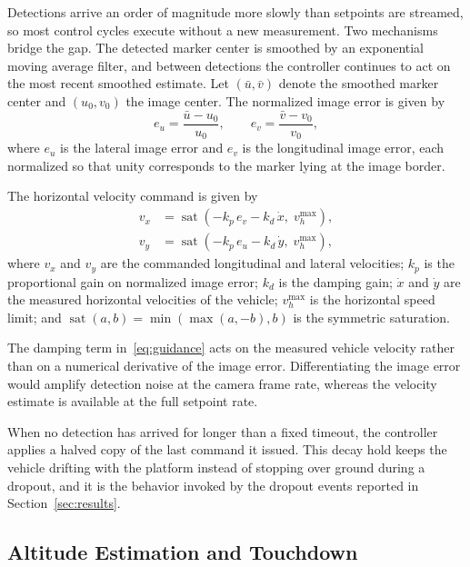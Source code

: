Detections arrive an order of magnitude more slowly than setpoints are streamed, so most
control cycles execute without a new measurement. Two mechanisms bridge the gap. The
detected marker center is smoothed by an exponential moving average filter, and between
detections the controller continues to act on the most recent smoothed estimate. Let
$(\bar{u},\bar{v})$ denote the smoothed marker center and $(u_0,v_0)$ the image center.
The normalized image error is given by
\begin{equation}
  e_u = \frac{\bar{u}-u_0}{u_0}, \qquad
  e_v = \frac{\bar{v}-v_0}{v_0},
  \label{eq:err}
\end{equation}
where $e_u$ is the lateral image error and $e_v$ is the longitudinal image error, each
normalized so that unity corresponds to the marker lying at the image border.

The horizontal velocity command is given by
\begin{equation}
  \begin{aligned}
    v_x &= \operatorname{sat}\!\left(-k_p\,e_v - k_d\,\dot{x},\; v_h^{\max}\right),\\
    v_y &= \operatorname{sat}\!\left(-k_p\,e_u - k_d\,\dot{y},\; v_h^{\max}\right),
  \end{aligned}
  \label{eq:guidance}
\end{equation}
where $v_x$ and $v_y$ are the commanded longitudinal and lateral velocities; $k_p$ is the
proportional gain on normalized image error; $k_d$ is the damping gain; $\dot{x}$ and
$\dot{y}$ are the measured horizontal velocities of the vehicle; $v_h^{\max}$ is the
horizontal speed limit; and $\operatorname{sat}(a,b)=\min(\max(a,-b),b)$ is the symmetric
saturation.

The damping term in~\eqref{eq:guidance} acts on the measured vehicle velocity rather than
on a numerical derivative of the image error. Differentiating the image error would
amplify detection noise at the camera frame rate, whereas the velocity estimate is
available at the full setpoint rate.

When no detection has arrived for longer than a fixed timeout, the controller applies a
halved copy of the last command it issued. This decay hold keeps the vehicle drifting
with the platform instead of stopping over ground during a dropout, and it is the
behavior invoked by the dropout events reported in Section~\ref{sec:results}.

\subsection{Altitude Estimation and Touchdown}

